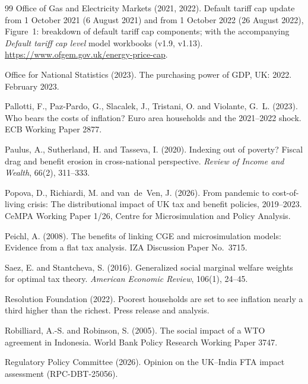 \begin{thebibliography}{99}
Office of Gas and Electricity Markets (2021, 2022).
\newblock Default tariff cap update from 1 October 2021 (6 August 2021) and from 1 October 2022 (26 August 2022), Figure~1: breakdown of default tariff cap components; with the accompanying \emph{Default tariff cap level} model workbooks (v1.9, v1.13).
\newblock \url{https://www.ofgem.gov.uk/energy-price-cap}.

Office for National Statistics (2023).
\newblock The purchasing power of GDP, UK: 2022.
 February 2023.

Pallotti, F., Paz-Pardo, G., Slacalek, J., Tristani, O. and Violante, G.~L. (2023).
\newblock Who bears the costs of inflation? Euro area households and the 2021--2022 shock.
\newblock ECB Working Paper 2877.

Paulus, A., Sutherland, H. and Tasseva, I. (2020).
\newblock Indexing out of poverty? Fiscal drag and benefit erosion in cross-national perspective.
\newblock \emph{Review of Income and Wealth}, 66(2), 311--333.

Popova, D., Richiardi, M. and van~de~Ven, J. (2026).
\newblock From pandemic to cost-of-living crisis: The distributional impact of UK tax and benefit policies, 2019--2023.
\newblock CeMPA Working Paper 1/26, Centre for Microsimulation and Policy Analysis.

Peichl, A. (2008).
\newblock The benefits of linking CGE and microsimulation models: Evidence from a flat tax analysis.
\newblock IZA Discussion Paper No.~3715.

Saez, E. and Stantcheva, S. (2016).
\newblock Generalized social marginal welfare weights for optimal tax theory.
\newblock \emph{American Economic Review}, 106(1), 24--45.

Resolution Foundation (2022).
\newblock Poorest households are set to see inflation nearly a third higher than the richest.
\newblock Press release and analysis.

Robilliard, A.-S. and Robinson, S. (2005).
\newblock The social impact of a WTO agreement in Indonesia.
\newblock World Bank Policy Research Working Paper 3747.

Regulatory Policy Committee (2026).
\newblock Opinion on the UK--India FTA impact assessment (RPC-DBT-25056).


\end{thebibliography}
